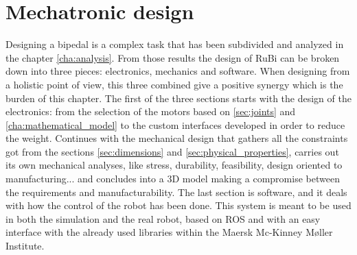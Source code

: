 \chapter{Mechatronic design} %
\label{cha:design}
Designing a bipedal is a complex task that has been subdivided and analyzed in the chapter \ref{cha:analysis}.
From those results the design of RuBi can be broken down into three pieces: electronics, mechanics and software.
When designing from a holistic point of view, this three combined give a positive synergy which is the burden of this chapter.
The first of the three sections starts with the design of the electronics: from the selection of the motors based on \ref{sec:joints} and \ref{cha:mathematical_model} to the custom interfaces developed in order to reduce the weight.
Continues with the mechanical design that gathers all the constraints got from the sections \ref{sec:dimensions} and \ref{sec:physical_properties}, carries out its own mechanical analyses, like stress, durability, feasibility, design oriented to manufacturing... and concludes into a 3D model making a compromise between the requirements and manufacturability.
The last section is software, and it deals with how the control of the robot has been done.
This system is meant to be used in both the simulation and the real robot, based on ROS and with an easy interface with the already used libraries within the Maersk Mc-Kinney Møller Institute.





